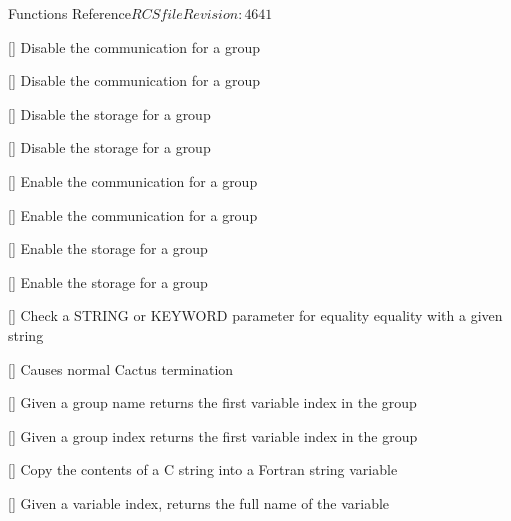 \begin{cactuspart}{ Functions Reference}{$RCSfile$}{$Revision: 4641 $}
\begin{Lentry}
\item[\code{CCTK\_DisableGroupComm}] [\pageref{CCTK-DisableGroupComm}]
  Disable the communication for a group

\item[\code{CCTK\_DisableGroupCommI}] [\pageref{CCTK-DisableGroupCommI}]
  Disable the communication for a group

\item[\code{CCTK\_DisableGroupStorage}] [\pageref{CCTK-DisableGroupStorage}]
  Disable the storage for a group

\item[\code{CCTK\_DisableGroupStorageI}] [\pageref{CCTK-DisableGroupStorageI}]
  Disable the storage for a group

\item[\code{CCTK\_EnableGroupComm}] [\pageref{CCTK-EnableGroupComm}]
  Enable the communication for a group

\item[\code{CCTK\_EnableGroupCommI}] [\pageref{CCTK-EnableGroupCommI}]
  Enable the communication for a group

\item[\code{CCTK\_EnableGroupStorage}] [\pageref{CCTK-EnableGroupStorage}]
  Enable the storage for a group

\item[\code{CCTK\_EnableGroupStorageI}] [\pageref{CCTK-EnableGroupStorageI}]
  Enable the storage for a group

\item[\code{CCTK\_Equals}] [\pageref{CCTK-Equals}]
  Check a STRING or KEYWORD parameter for equality equality
  with a given string

\item[\code{CCTK\_Exit}] [\pageref{CCTK-Exit}]
  Causes normal Cactus termination

\item[\code{CCTK\_FirstVarIndex}] [\pageref{CCTK-FirstVarIndex}]
  Given a group name returns the first variable index in the group

\item[\code{CCTK\_FirstVarIndexI}] [\pageref{CCTK-FirstVarIndexI}]
  Given a group index returns the first variable index in the group

\item[\code{CCTK\_FortranString}] [\pageref{CCTK-FortranString}]
  Copy the contents of a C string into a Fortran string variable

\item[\code{CCTK\_FullName}] [\pageref{CCTK-FullName}]
  Given a variable index, returns the full name of the variable


\end{Lentry}
\end{cactuspart}
